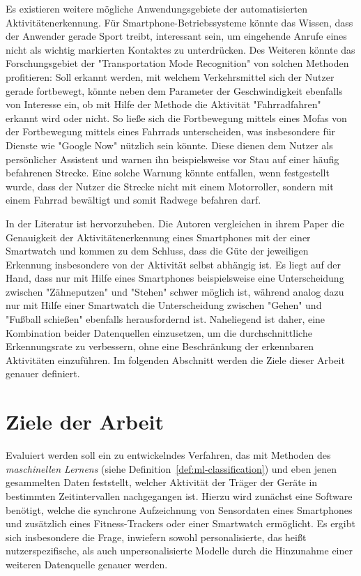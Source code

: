 Es existieren weitere mögliche Anwendungsgebiete der automatisierten Aktivitätenerkennung. Für Smartphone-Betriebssysteme könnte das Wissen, dass der Anwender gerade Sport treibt, interessant sein, um eingehende Anrufe eines nicht als wichtig markierten Kontaktes zu unterdrücken. Des Weiteren könnte das Forschungsgebiet der "Transportation Mode Recognition" von solchen Methoden profitieren: Soll erkannt werden, mit welchem Verkehrsmittel sich der Nutzer gerade fortbewegt, könnte neben dem Parameter der Geschwindigkeit ebenfalls von Interesse ein, ob mit Hilfe der Methode die Aktivität "Fahrradfahren" erkannt wird oder nicht. So ließe sich die Fortbewegung mittels eines Mofas von der Fortbewegung mittels eines Fahrrads unterscheiden, was insbesondere für Dienste wie "Google Now" nützlich sein könnte. Diese dienen dem Nutzer als persönlicher Assistent und warnen ihn beispielsweise vor Stau auf einer häufig befahrenen Strecke. Eine solche Warnung könnte entfallen, wenn festgestellt wurde, dass der Nutzer die Strecke nicht mit einem Motorroller, sondern mit einem Fahrrad bewältigt und somit Radwege befahren darf.

In der Literatur ist \cite{Weiss2016} hervorzuheben. Die Autoren vergleichen in ihrem Paper die Genauigkeit der Aktivitätenerkennung eines Smartphones mit der einer Smartwatch und kommen zu dem Schluss, dass die Güte der jeweiligen Erkennung insbesondere von der Aktivität selbst abhängig ist. Es liegt auf der Hand, dass nur mit Hilfe eines Smartphones beispielsweise eine Unterscheidung zwischen "Zähneputzen" und "Stehen" schwer möglich ist, während analog dazu nur mit Hilfe einer Smartwatch die Unterscheidung zwischen "Gehen" und "Fußball schießen" ebenfalls herausfordernd ist. Naheliegend ist daher, eine Kombination beider Datenquellen einzusetzen, um die durchschnittliche Erkennungsrate zu verbessern, ohne eine Beschränkung der erkennbaren Aktivitäten einzuführen. Im folgenden Abschnitt werden die Ziele dieser Arbeit genauer definiert.
\vspace{-0.25cm}
\section{Ziele der Arbeit} %
\label{sec:goals}
Evaluiert werden soll ein zu entwickelndes Verfahren, das mit Methoden des \textit{maschinellen Lernens} (siehe Definition~\ref{def:ml-classification}) und eben jenen gesammelten Daten feststellt, welcher Aktivität der Träger der Geräte in bestimmten Zeitintervallen nachgegangen ist. Hierzu wird zunächst eine Software benötigt, welche die synchrone Aufzeichnung von Sensordaten eines Smartphones und zusätzlich eines Fitness-Trackers oder einer Smartwatch ermöglicht. Es ergibt sich insbesondere die Frage, inwiefern sowohl personalisierte, das heißt nutzerspezifische, als auch unpersonalisierte Modelle durch die Hinzunahme einer weiteren Datenquelle genauer werden.

